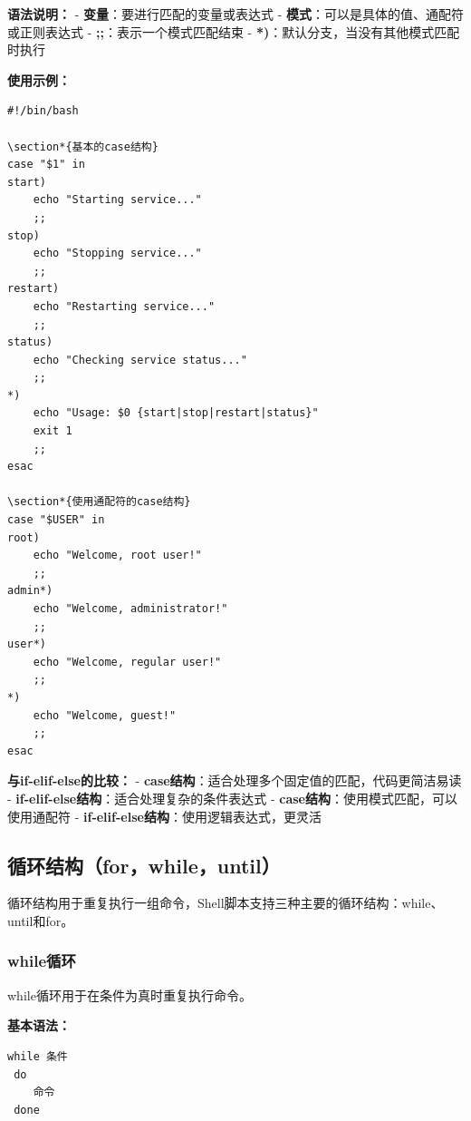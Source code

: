 \documentclass[12pt,UTF8]{ctexbook}
\begin{document}
\textbf{语法说明：}
- \textbf{变量}：要进行匹配的变量或表达式
- \textbf{模式}：可以是具体的值、通配符或正则表达式
- \textbf{;;}：表示一个模式匹配结束
- \textbf{*)}：默认分支，当没有其他模式匹配时执行

\textbf{使用示例：}
\begin{verbatim}
#!/bin/bash

\section*{基本的case结构}
case "$1" in
start)
    echo "Starting service..."
    ;;
stop)
    echo "Stopping service..."
    ;;
restart)
    echo "Restarting service..."
    ;;
status)
    echo "Checking service status..."
    ;;
*)
    echo "Usage: $0 {start|stop|restart|status}"
    exit 1
    ;;
esac

\section*{使用通配符的case结构}
case "$USER" in
root)
    echo "Welcome, root user!"
    ;;
admin*)
    echo "Welcome, administrator!"
    ;;
user*)
    echo "Welcome, regular user!"
    ;;
*)
    echo "Welcome, guest!"
    ;;
esac
\end{verbatim}

\textbf{与if-elif-else的比较：}
- \textbf{case结构}：适合处理多个固定值的匹配，代码更简洁易读
- \textbf{if-elif-else结构}：适合处理复杂的条件表达式
- \textbf{case结构}：使用模式匹配，可以使用通配符
- \textbf{if-elif-else结构}：使用逻辑表达式，更灵活

\subsection{循环结构（for，while，until）}
循环结构用于重复执行一组命令，Shell脚本支持三种主要的循环结构：while、until和for。

\subsubsection{while循环}
while循环用于在条件为真时重复执行命令。

\textbf{基本语法：}
\begin{verbatim}
while 条件
 do
    命令
 done
\end{verbatim}
\end{document}
